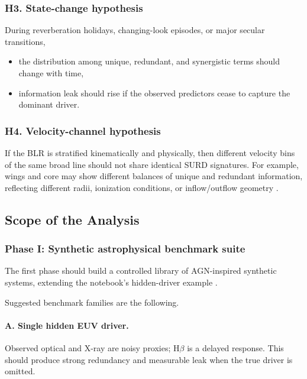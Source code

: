 \documentclass{article}
\begin{document}
\subsubsection{H3. State-change hypothesis}

During reverberation holidays, changing-look episodes, or major secular transitions,
\begin{itemize}
    \item the distribution among unique, redundant, and synergistic terms should change with time,
    \item information leak should rise if the observed predictors cease to capture the dominant driver.
\end{itemize}

\subsubsection{H4. Velocity-channel hypothesis}

If the BLR is stratified kinematically and physically, then different velocity bins of the same broad line should not share identical SURD signatures. For example, wings and core may show different balances of unique and redundant information, reflecting different radii, ionization conditions, or inflow/outflow geometry \cite{LuEtAl2022,FengEtAl2024,FengEtAl2021}.

\subsection{Scope of the Analysis}

\subsubsection{Phase I: Synthetic astrophysical benchmark suite}

The first phase should build a controlled library of AGN-inspired synthetic systems, extending the notebook's hidden-driver example \cite{AGN_SURD_notebook}.

Suggested benchmark families are the following.

\paragraph{A. Single hidden EUV driver.}
Observed optical and X-ray are noisy proxies; H$\beta$ is a delayed response. This should produce strong redundancy and measurable leak when the true driver is omitted.
\end{document}
